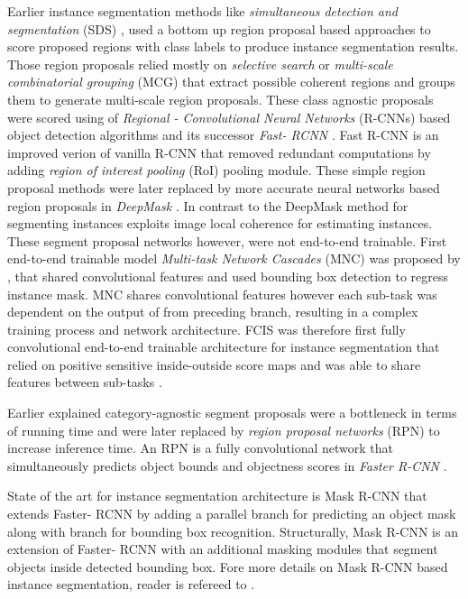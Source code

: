 Earlier instance segmentation methods like \textit{simultaneous detection and segmentation} (SDS) \cite{Hariharan2014}, used a bottom up region proposal based approaches to score proposed regions with class labels to produce instance segmentation results. Those region proposals relied mostly on \textit{selective search} \cite{Uijlings2013} or  \textit{multi-scale combinatorial grouping} (MCG) \cite{Arbelaez2014} that extract possible coherent regions and groups them to generate multi-scale region proposals. These class agnostic proposals were scored using of \textit{Regional - Convolutional Neural Networks} (R-CNNs) based object detection algorithms \cite{Girshick2014} and its successor \textit{Fast- RCNN} \cite{Girshick2015}. Fast R-CNN is an improved verion of vanilla R-CNN that removed redundant computations by adding \textit{region of interest pooling} (RoI) pooling module. These simple region proposal methods were later replaced by more accurate neural networks based region proposals in \textit{DeepMask} \cite{Pinheiro2015}. In contrast to the DeepMask method for segmenting instances \cite{Dai2016} exploits image local coherence for estimating instances. These segment proposal networks however, were not end-to-end trainable.  First end-to-end trainable model \textit{Multi-task Network Cascades} (MNC) was proposed by \cite{Dai2016b}, that shared convolutional features and used bounding box detection to regress instance mask. MNC shares convolutional features however each sub-task was dependent on the output of from preceding branch, resulting in a complex training process and network architecture. 
FCIS was therefore first fully convolutional end-to-end trainable architecture for instance segmentation that relied on positive sensitive inside-outside score maps and was able to share features between sub-tasks  \cite{Li2017}. 

Earlier explained category-agnostic segment proposals were a bottleneck in terms of running time and were later replaced by \textit{region proposal networks} (RPN) to increase inference time. An RPN is a fully convolutional network that simultaneously predicts object bounds and objectness scores in \textit{Faster R-CNN} \cite{Ren2017}.

State of the art for instance segmentation architecture is Mask R-CNN that extends Faster- RCNN by adding a parallel branch for predicting an object mask along with branch for bounding box recognition. Structurally, Mask R-CNN is an extension of Faster- RCNN \cite{Ren2017} with an additional masking modules that segment objects inside detected bounding box. Fore more details on Mask R-CNN based instance segmentation, reader is refereed to \cite{He2017}.

